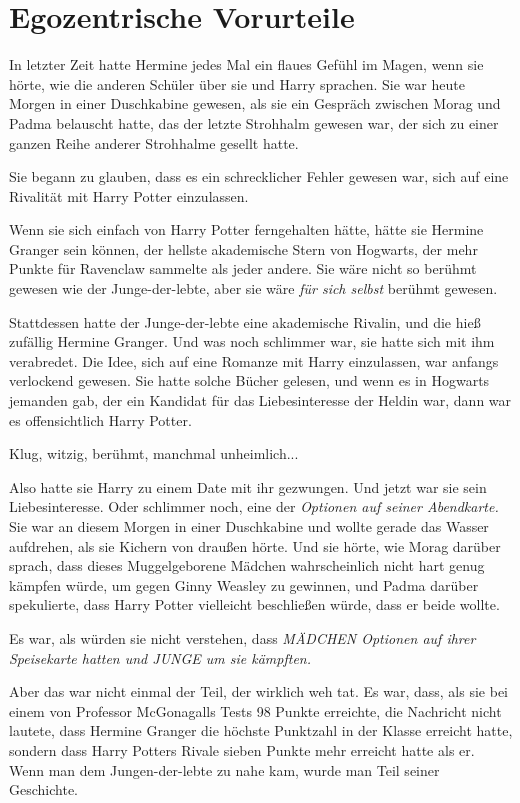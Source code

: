 \chapter{Egozentrische Vorurteile}

In letzter Zeit hatte Hermine jedes Mal ein flaues Gefühl im Magen, wenn sie
hörte, wie die anderen Schüler über sie und Harry sprachen. Sie war heute Morgen
in einer Duschkabine gewesen, als sie ein Gespräch zwischen Morag und Padma
belauscht hatte, das der letzte Strohhalm gewesen war, der sich zu einer ganzen
Reihe anderer Strohhalme gesellt hatte.

Sie begann zu glauben, dass es ein schrecklicher Fehler gewesen war, sich auf
eine Rivalität mit Harry Potter einzulassen.

Wenn sie sich einfach von Harry Potter ferngehalten hätte, hätte sie Hermine
Granger sein können, der hellste akademische Stern von Hogwarts, der mehr Punkte
für Ravenclaw sammelte als jeder andere. Sie wäre nicht so berühmt gewesen wie
der Junge-der-lebte, aber sie wäre\emph{ für sich selbst} berühmt gewesen.

Stattdessen hatte der Junge-der-lebte eine akademische Rivalin, und die hieß
zufällig Hermine Granger. Und was noch schlimmer war, sie hatte sich mit ihm
verabredet. Die Idee, sich auf eine Romanze mit Harry einzulassen, war anfangs
verlockend gewesen. Sie hatte solche Bücher gelesen, und wenn es in Hogwarts
jemanden gab, der ein Kandidat für das Liebesinteresse der Heldin war, dann war
es offensichtlich Harry Potter.

Klug, witzig, berühmt, manchmal unheimlich...

Also hatte sie Harry zu einem Date mit ihr gezwungen. Und jetzt war sie sein
Liebesinteresse. Oder schlimmer noch, eine der \emph{Optionen auf seiner
Abendkarte.} Sie war an diesem Morgen in einer Duschkabine und wollte gerade das
Wasser aufdrehen, als sie Kichern von draußen hörte. Und sie hörte, wie Morag
darüber sprach, dass dieses Muggelgeborene Mädchen wahrscheinlich nicht hart
genug kämpfen würde, um gegen Ginny Weasley zu gewinnen, und Padma darüber
spekulierte, dass Harry Potter vielleicht beschließen würde, dass er beide
wollte.

Es war, als würden sie nicht verstehen, dass \emph{MÄDCHEN Optionen auf ihrer
Speisekarte hatten und JUNGE um sie kämpften.}

Aber das war nicht einmal der Teil, der wirklich weh tat. Es war, dass, als sie
bei einem von Professor McGonagalls Tests 98 Punkte erreichte, die Nachricht
nicht lautete, dass Hermine Granger die höchste Punktzahl in der Klasse erreicht
hatte, sondern dass Harry Potters Rivale sieben Punkte mehr erreicht hatte als
er. Wenn man dem Jungen-der-lebte zu nahe kam, wurde man Teil seiner Geschichte.

